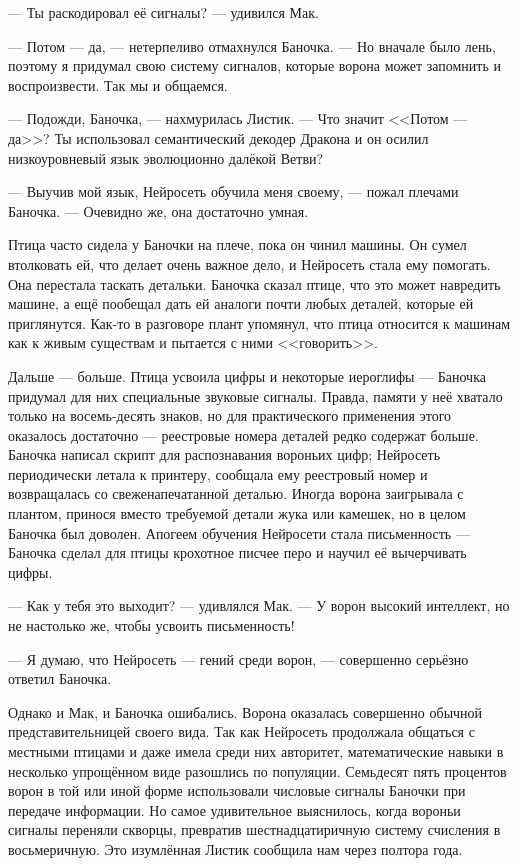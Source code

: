 --- Ты раскодировал её сигналы? --- удивился Мак.

--- Потом --- да, --- нетерпеливо отмахнулся Баночка.
--- Но вначале было лень, поэтому я придумал свою систему сигналов, которые ворона может запомнить и воспроизвести.
Так мы и общаемся.

--- Подожди, Баночка, --- нахмурилась Листик.
--- Что значит <<Потом --- да>>?
Ты использовал семантический декодер Дракона и он осилил низкоуровневый язык эволюционно далёкой Ветви?

--- Выучив мой язык, Нейросеть обучила меня своему, --- пожал плечами Баночка.
--- Очевидно же, она достаточно умная.

Птица часто сидела у Баночки на плече, пока он чинил машины.
Он сумел втолковать ей, что делает очень важное дело, и Нейросеть стала ему помогать.
Она перестала таскать детальки.
Баночка сказал птице, что это может навредить машине, а ещё пообещал дать ей аналоги почти любых деталей, которые ей приглянутся.
Как-то в разговоре плант упомянул, что птица относится к машинам как к живым существам и пытается с ними <<говорить>>.

Дальше --- больше.
Птица усвоила цифры и некоторые иероглифы --- Баночка придумал для них специальные звуковые сигналы.
Правда, памяти у неё хватало только на восемь-десять знаков, но для практического применения этого оказалось достаточно --- реестровые номера деталей редко содержат больше.
Баночка написал скрипт для распознавания вороньих цифр;
Нейросеть периодически летала к принтеру, сообщала ему реестровый номер и возвращалась со свеженапечатанной деталью.
Иногда ворона заигрывала с плантом, принося вместо требуемой детали жука или камешек, но в целом Баночка был доволен.
Апогеем обучения Нейросети стала письменность --- Баночка сделал для птицы крохотное писчее перо и научил её вычерчивать цифры.

--- Как у тебя это выходит? --- удивлялся Мак.
--- У ворон высокий интеллект, но не настолько же, чтобы усвоить письменность!

--- Я думаю, что Нейросеть --- гений среди ворон, --- совершенно серьёзно ответил Баночка.

Однако и Мак, и Баночка ошибались.
Ворона оказалась совершенно обычной представительницей своего вида.
Так как Нейросеть продолжала общаться с местными птицами и даже имела среди них авторитет, математические навыки в несколько упрощённом виде разошлись по популяции.
Семьдесят пять процентов ворон в той или иной форме использовали числовые сигналы Баночки при передаче информации.
Но самое удивительное выяснилось, когда вороньи сигналы переняли скворцы, превратив шестнадцатиричную систему счисления в восьмеричную.
Это изумлённая Листик сообщила нам через полтора года.

